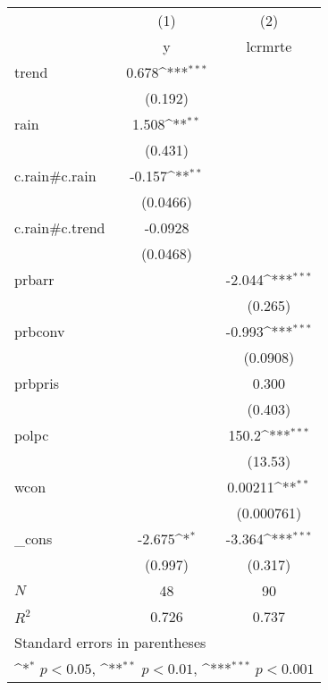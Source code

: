 {
\def\sym#1{\ifmmode^{#1}\else\(^{#1}\)\fi}
\begin{tabular}{l*{2}{c}}
\hline\hline
            &\multicolumn{1}{c}{(1)}&\multicolumn{1}{c}{(2)}\\
            &\multicolumn{1}{c}{y}&\multicolumn{1}{c}{lcrmrte}\\
\hline
trend       &       0.678\sym{***}&                     \\
            &     (0.192)         &                     \\
[1em]
rain        &       1.508\sym{**} &                     \\
            &     (0.431)         &                     \\
[1em]
c.rain#c.rain&      -0.157\sym{**} &                     \\
            &    (0.0466)         &                     \\
[1em]
c.rain#c.trend&     -0.0928         &                     \\
            &    (0.0468)         &                     \\
[1em]
prbarr      &                     &      -2.044\sym{***}\\
            &                     &     (0.265)         \\
[1em]
prbconv     &                     &      -0.993\sym{***}\\
            &                     &    (0.0908)         \\
[1em]
prbpris     &                     &       0.300         \\
            &                     &     (0.403)         \\
[1em]
polpc       &                     &       150.2\sym{***}\\
            &                     &     (13.53)         \\
[1em]
wcon        &                     &     0.00211\sym{**} \\
            &                     &  (0.000761)         \\
[1em]
\_cons      &      -2.675\sym{*}  &      -3.364\sym{***}\\
            &     (0.997)         &     (0.317)         \\
\hline
\(N\)       &          48         &          90         \\
\(R^{2}\)   &       0.726         &       0.737         \\
\hline\hline
\multicolumn{3}{l}{\footnotesize Standard errors in parentheses}\\
\multicolumn{3}{l}{\footnotesize \sym{*} \(p<0.05\), \sym{**} \(p<0.01\), \sym{***} \(p<0.001\)}\\
\end{tabular}
}
